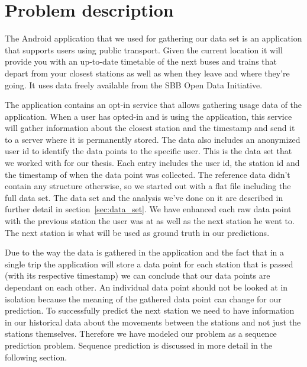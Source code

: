 \newpage
\chapter{Problem description}
The Android application that we used for gathering our data set is an application that supports users using public transport. Given the current location it will provide you with an up-to-date timetable of the next buses and trains that depart from your closest stations as well as when they leave and where they're going. It uses data freely available from the SBB Open Data Initiative. \cite{SBBOpenData} 

The application contains an opt-in service that allows gathering usage data of the application. When a user has opted-in and is using the application, this service will gather information about the closest station and the timestamp and send it to a server where it is permanently stored. The data also includes an anonymized user id to identify the data points to the specific user. This is the data set that we worked with for our thesis. Each entry includes the user id, the station id and the timestamp of when the data point was collected. The reference data didn't contain any structure otherwise, so we started out with a flat file including the full data set. The data set and the analysis we've done on it are described in further detail in section~\ref{sec:data_set}. We have enhanced each raw data point with the previous station the user was at as well as the next station he went to. The next station is what will be used as ground truth in our predictions.

Due to the way the data is gathered in the application and the fact that in a single trip the application will store a data point for each station that is passed (with its respective timestamp) we can conclude that our data points are dependant on each other. An individual data point should not be looked at in isolation because the meaning of the gathered data point can change for our prediction. To successfully predict the next station we need to have information in our historical data about the movements between the stations and not just the stations themselves. Therefore we have modeled our problem as a sequence prediction problem. Sequence prediction is discussed in more detail in the following section. 

